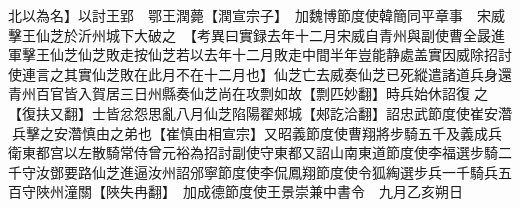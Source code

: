 北以為名】以討王郢　鄂王潤薨【潤宣宗子】　加魏博節度使韓簡同平章事　宋威擊王仙芝於沂州城下大破之　【考異曰實録去年十二月宋威自青州與副使曹全晸進軍擊王仙芝仙芝敗走按仙芝若以去年十二月敗走中間半年豈能静處盖實因威除招討使連言之其實仙芝敗在此月不在十二月也】仙芝亡去威奏仙芝已死縱遣諸道兵身還青州百官皆入賀居三日州縣奏仙芝尚在攻剽如故【剽匹妙翻】時兵始休詔復之【復扶又翻】士皆忿怨思亂八月仙芝陷陽翟郟城【郟訖洽翻】詔忠武節度使崔安濳兵擊之安濳慎由之弟也【崔慎由相宣宗】又昭義節度使曹翔將步騎五千及義成兵衛東都宫以左散騎常侍曾元裕為招討副使守東都又詔山南東道節度使李福選步騎二千守汝鄧要路仙芝進逼汝州詔邠寧節度使李侃鳳翔節度使令狐綯選步兵一千騎兵五百守陜州潼關【陜失冉翻】　加成德節度使王景崇兼中書令　九月乙亥朔日